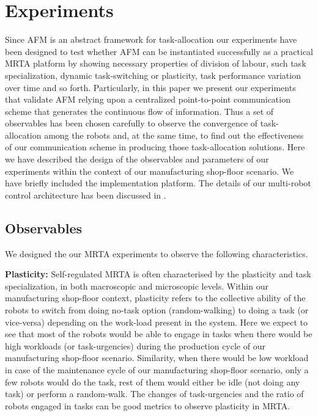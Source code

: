 \documentclass[smallcondensed]{svjour3}
\begin{document}
\section{Experiments}
\label{sec:expt}
Since AFM is an abstract framework for task-allocation our experiments have been designed to test whether AFM can be instantiated successfully as a practical MRTA platform by showing necessary properties of division of labour, such task specialization, dynamic task-switching or plasticity,  task performance variation over time and so forth. Particularly, in this paper we present our experiments that validate AFM relying upon a centralized point-to-point communication scheme that generates the continuous flow of information. Thus a set of observables has been chosen carefully to observe the convergence of  task-allocation among the robots and, at the same time, to find out the effectiveness of our communication scheme in producing those task-allocation solutions. Here we have described the design of the observables and parameters of our experiments within the context of our manufacturing shop-floor scenario.  We have briefly included the implementation platform. The details of our multi-robot control architecture has been discussed in \cite{Sarker2010control}.
\subsection{Observables}
We designed the our MRTA experiments to observe the following characteristics.

\textbf{Plasticity:} %
Self-regulated MRTA is often characterised by the plasticity and task specialization, in both macroscopic and microscopic levels. Within our manufacturing shop-floor context, plasticity refers to the collective ability of the robots to switch from doing no-task option (random-walking) to doing a task (or vice-versa) depending on the work-load present in the system. Here we expect to see that most of the robots would be able to engage in tasks when there would be high workloads (or task-urgencies) during the production cycle of our manufacturing shop-floor scenario. Similarity, when there would be low workload in case of the maintenance cycle of our manufacturing shop-floor scenario, only a few robots would do the task, rest of them would either be idle (not doing any task) or perform a random-walk.  The changes of task-urgencies and the ratio of robots engaged in tasks can be good metrics to observe plasticity in MRTA.
\end{document}
